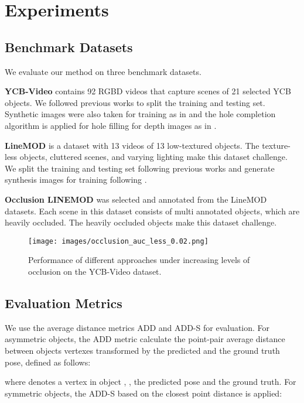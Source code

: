 \section{Experiments}
\subsection{Benchmark Datasets}
We evaluate our method on three benchmark datasets. 

\textbf{YCB-Video} \cite{calli2015ycb} contains 92 RGBD videos that capture scenes of 21 selected YCB objects. We followed previous works \cite{xiang2017posecnn,wang2019densefusion,he2020pvn3d} to split the training and testing set. Synthetic images were also taken for training as in \cite{xiang2017posecnn} and the hole completion algorithm \cite{ku2018defense} is applied for hole filling for depth images as in \cite{he2020pvn3d}. 

\textbf{LineMOD} \cite{hinterstoisser2011multimodal} is a dataset with 13 videos of 13 low-textured objects. The texture-less objects, cluttered scenes, and varying lighting make this dataset challenge. We split the training and testing set following previous works \cite{xiang2017posecnn,peng2019pvnet} and generate synthesis images for training following \cite{peng2019pvnet,he2020pvn3d}.

\textbf{Occlusion LINEMOD} \cite{OcclusionLMbrachmann2014learning} was selected and annotated from the LineMOD datasets. Each scene in this dataset consists of multi annotated objects, which are heavily occluded. The heavily occluded objects make this dataset challenge.


\begin{figure}
  \centering
  \texttt{[image: images/occlusion\_auc\_less\_0.02.png]}
  \caption{
    Performance of different approaches under increasing levels of occlusion on the YCB-Video dataset.
  }
  \label{fig:occlussion_auc}
\end{figure}

\subsection{Evaluation Metrics}
We use the average distance metrics ADD and ADD-S for evaluation. For asymmetric objects, the ADD metric calculate the point-pair average distance between objects vertexes transformed by the predicted and the ground truth pose, defined as follows:

where  denotes a vertex in object , ,  the predicted pose and  the ground truth.
For symmetric objects, the ADD-S based on the closest point distance is applied:

